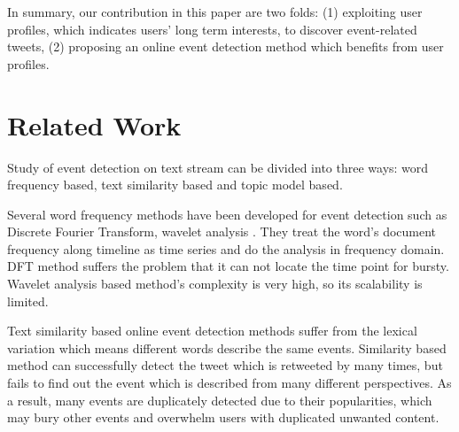 \documentclass{llncs}
\begin{document}
In summary, our contribution in this paper are two folds:
(1) exploiting user profiles, which indicates users' long term interests, to discover event-related tweets,
(2) proposing an online event detection method which benefits from user profiles.

\section{Related Work}
Study of event detection on text stream can be divided into three ways: word frequency based, text similarity based and topic model based.

Several word frequency methods have been developed for event detection such as Discrete Fourier Transform\cite{he2007analyzingDFT}, wavelet analysis \cite{weng2011eventWavelet}.
They treat the word's document frequency along timeline as time series and do the analysis in frequency domain. 
DFT method suffers the problem that it can not locate the time point for bursty.
Wavelet analysis based method's complexity is very high, so its scalability is limited. 

 Text similarity based online event detection methods\cite{petrovic2010streaming}\cite{mccreadiescalable}  suffer from the lexical variation which means different words describe the same events.
 Similarity based method can successfully detect the tweet which is retweeted by many times, but fails to find out the event which is described from many different perspectives.
 As a result, many events are duplicately detected due to their popularities, which may bury other events and overwhelm users with duplicated unwanted content.
\end{document}

